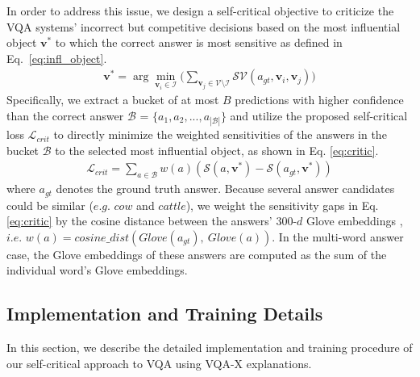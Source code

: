 \documentclass{article}
\begin{document}
In order to address this issue, we design a self-critical objective to criticize the VQA systems' incorrect but competitive decisions based on the most influential object $\textbf{v}^*$ to which the correct answer is most sensitive as defined in Eq.\ \ref{eq:infl_object}. 
\begin{align}
    \textbf{v}^* = \arg\min_{ \textbf{v}_i \in \mathcal{I}} \Big(  \sum_{\textbf{v}_j \in \mathcal{V} \setminus \mathcal{I}} \mathcal{SV}(a_{gt}, \textbf{v}_i, \textbf{v}_j) \Big) \label{eq:infl_object}
\end{align}
Specifically, we extract a bucket of at most $B$ predictions with higher confidence than the correct answer $\mathcal{B}$ = $\{a_1, a_2, ..., a_{|\mathcal{B}|}\}$ and utilize the proposed self-critical loss $\mathcal{L}_{crit}$ to directly minimize the weighted sensitivities  of the answers in the bucket $\mathcal{B}$  to the selected most influential object, as shown in Eq. \ref{eq:critic}.
\begin{align}
    \mathcal{L}_{crit} = \sum_{a \in \mathcal{B}} w(a) (\mathcal{S}(a, \textbf{v}^*) - \mathcal{S}(a_{gt}, \textbf{v}^*))\label{eq:critic}
\end{align}
where $a_{gt}$ denotes the ground truth answer. Because several answer candidates could be similar ($e.g.$ $cow$ and $cattle$), we weight the sensitivity gaps in Eq. \ref{eq:critic} by the cosine distance between the answers' $300$-$d$ Glove embeddings \cite{pennington2014glove}, $i.e.$ $w(a) = cosine\_dist(Glove(a_{gt}),~ Glove(a))$. In the multi-word answer case, the Glove embeddings of these answers are computed as the sum of the individual word's Glove embeddings.

\subsection{Implementation and Training Details}
In this section, we describe the detailed implementation and training procedure of our self-critical approach to VQA using VQA-X explanations.
\end{document}
